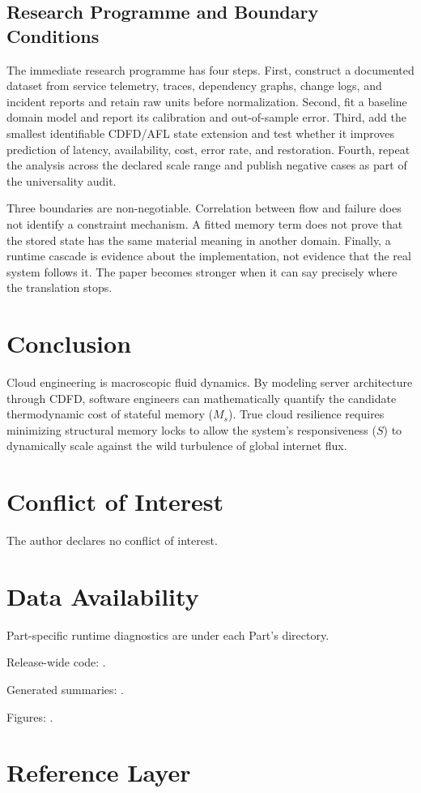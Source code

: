 \documentclass[11pt,a4paper]{article}
\begin{document}
\subsection{Research Programme and Boundary Conditions}

The immediate research programme has four steps. First, construct a documented
dataset from service telemetry, traces, dependency graphs, change logs, and incident reports and retain raw units before normalization.
Second, fit a baseline domain model and report its calibration and out-of-sample
error. Third, add the smallest identifiable CDFD/AFL state extension and test
whether it improves prediction of latency, availability, cost, error rate, and restoration. Fourth, repeat the
analysis across the declared scale range and publish negative cases as part of
the universality audit.

Three boundaries are non-negotiable. Correlation between flow and failure does
not identify a constraint mechanism. A fitted memory term does not prove that
the stored state has the same material meaning in another domain. Finally, a
runtime cascade is evidence about the implementation, not evidence that the
real system follows it. The paper becomes stronger when it can say precisely
where the translation stops.



\section{Conclusion}
Cloud engineering is macroscopic fluid dynamics. By modeling server architecture through CDFD, software engineers can mathematically quantify the candidate thermodynamic cost of stateful memory ($M_s$). True cloud resilience requires minimizing structural memory locks to allow the system's responsiveness ($S$) to dynamically scale against the wild turbulence of global internet flux.
\section*{Conflict of Interest} The author declares no conflict of interest.
\section*{Data Availability}
Part-specific runtime diagnostics are under each Part's  directory.

Release-wide code: .

Generated summaries: .

Figures: .


\section{Reference Layer}


\end{document}
